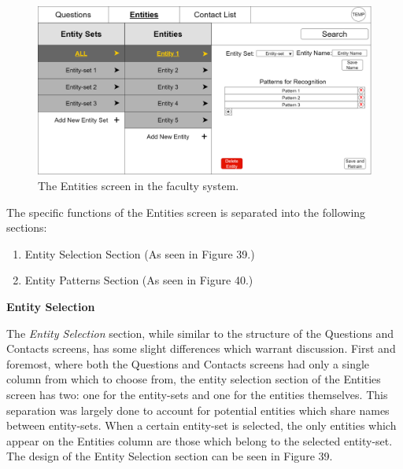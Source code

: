 \documentclass[titlepage, 12pt]{article}
\begin{document}
\begin{figure}[h]
    \centering\includegraphics[width=1\linewidth]{images/system-design/faculty-entities.png}
    \caption{The Entities screen in the faculty system.}
\end{figure}

The specific functions of the Entities screen is separated into the following sections:

\begin{enumerate}
    \item Entity Selection Section (As seen in Figure 39.)
    \item Entity Patterns Section (As seen in Figure 40.)
\end{enumerate}

\textbf{Entity Selection}

The \emph{Entity Selection} section, while similar to the structure of the Questions and Contacts screens, has some slight differences which warrant discussion. First and foremost, where both the Questions and Contacts screens had only a single column from which to choose from, the entity selection section of the Entities screen has two: one for the entity-sets and one for the entities themselves. This separation was largely done to account for potential entities which share names between entity-sets. When a certain entity-set is selected, the only entities which appear on the Entities column are those which belong to the selected entity-set. The design of the Entity Selection section can be seen in Figure 39.
\end{document}
